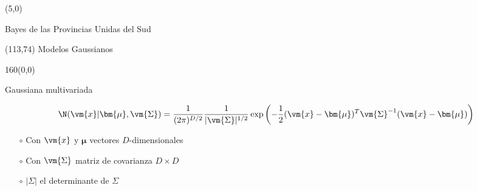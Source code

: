 \documentclass[shownotes,aspectratio=169]{beamer}
\begin{document}
 \color{black!85}

\small
{}

\begin{frame}
 
 \begin{textblock}{80}(5,0)
\begin{center}
 \Large  \textcolor{black!66}{Bayes de las Provincias Unidas del Sud}
\end{center}
\end{textblock}


 \begin{textblock}{47}(113,74)
\centering \Large  \textcolor{white!55}{Modelos Gaussianos}
\end{textblock}

{}
\end{frame}


 \begin{frame}[plain]
 \begin{textblock}{160}(0,0)
\begin{center}
 \Large Gaussiana multivariada
\end{center}
\end{textblock}


\begin{align*}
\N(\vm{x}|\bm{\mu},\vm{\Sigma}) = \frac{1}{(2\pi)^{D/2}} \frac{1}{|\vm{\Sigma}|^{1/2}} \exp\left( - \frac{1}{2} (\vm{x}-\bm{\mu})^T \vm{\Sigma}^{-1} (\vm{x}-\bm{\mu}) \right)
\end{align*}

\vspace{0.5cm}

\begin{itemize}
 \item[$\circ$] Con $\vm{x}$ y $\bm{\mu}$ vectores $D$-dimensionales
 \item[$\circ$] Con $\vm{\Sigma}$ matriz de covarianza $D \times D$
 \item[$\circ$] $|\Sigma|$ el determinante de $\Sigma$
\end{itemize}

 \end{frame}
 
\end{document}
